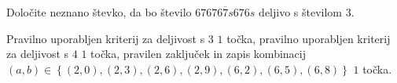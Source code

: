 \documentclass[addpoints]{exam}
\begin{document}
\begin{questions}


    \newpage

    \question[2]
    Določite neznano števko, da bo število $\overline{676767s676s}$ deljivo s številom $3$.




        \begin{solution}[6cm]
            Pravilno uporabljen kriterij za deljivost s $3$ $1$ točka, pravilno uporabljen kriterij za deljivost s $4$ $1$ točka, 
            pravilen zaključek in zapis kombinacij $(a,b)\in\left\{(2,0),(2,3),(2,6),(2,9),(6,2),(6,5),(6,8)\right\}$ $1$ točka.
        \end{solution}



\end{questions}
\end{document}
